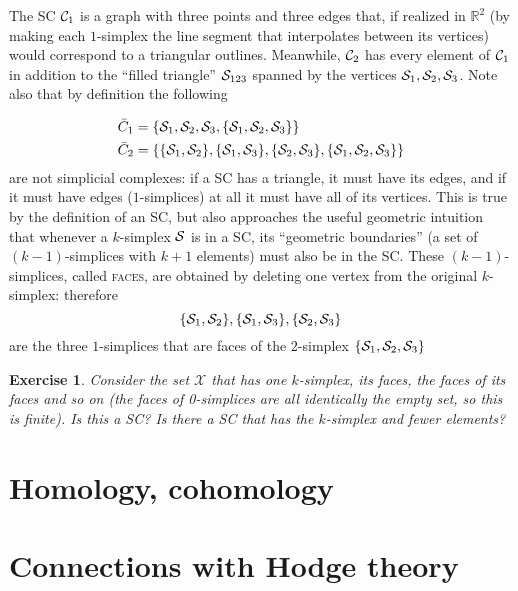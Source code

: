 \documentclass{tufte-handout}
\newtheorem{exercise}{Exercise}
\newcommand{\define}{\textsc}
\newcommand{\re}{\mathbb{R}}
\begin{document}
The SC $\sc_1$ is a graph with three points and three edges that, if realized in $\re^2$ (by making each $1$-simplex the line segment that interpolates between its vertices) would correspond to a triangular outlines. Meanwhile, $\sc_2$ has every element of $\sc_1$ in addition to the ``filled triangle'' $\se_{123}$ spanned  by the vertices $\se_1,\se_2,\se_3$. Note also that by definition the following

\begin{align*}
    \bar{C}_1 &= \{\se_1,\se_2,\se_3,\{\se_1,\se_2,\se_3\}\}\\
    \bar{C}_2 &= \{\{\se_1,\se_2\},\{\se_1,\se_3\},\{\se_2,\se_3\},\{\se_1,\se_2,\se_3\}\}
\end{align*}
are not simplicial complexes: if a SC has a triangle, it must have its edges, and if it must have edges ($1$-simplices) at all it must have all of its vertices. This is true by the definition of an SC, but also approaches the useful geometric intuition that whenever a $k$-simplex $\se$ is in a SC, its ``geometric boundaries'' (a set of $(k-1)$-simplices with $k+1$ elements) must also be in the SC. These $(k-1)$-simplices, called \define{faces}, are obtained by deleting one vertex from the original $k$-simplex: therefore
\[
\{\se_1,\se_2\},\{\se_1,\se_3\},\{\se_2,\se_3\}
\]
are the three $1$-simplices that are faces of the $2$-simplex $\{\se_1,\se_2,\se_3\}$
\begin{exercise}
Consider the set $\mathcal X$ that has one $k$-simplex, its faces, the faces of its faces and so on (the faces of 0-simplices are all identically the empty set, so this is finite). Is this a SC? Is there a SC that has the $k$-simplex and fewer elements?
\end{exercise}
\section{Homology, cohomology}

\section{Connections with Hodge theory}
\nocite{*}


\end{document}

